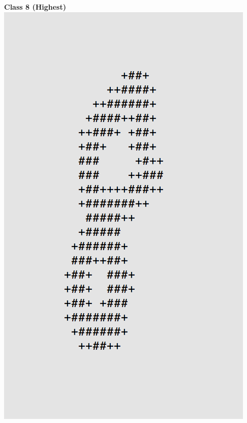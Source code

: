 \documentclass[11pt]{article}
\begin{document}
\begin{center}
\begin{multicols}{2}
\textbf{Class 8 (Highest)}\\
\includegraphics[scale=0.4]{part1/1/high_8.png}


\end{multicols}
\end{center}
\end{document}
